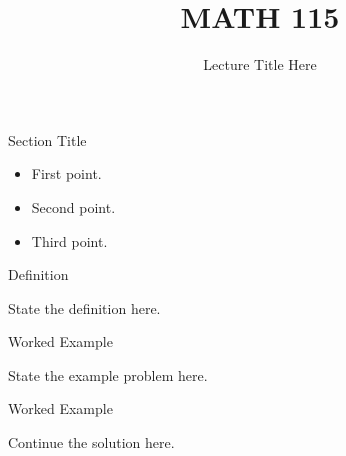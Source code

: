 \documentclass[aspectratio=1610]{beamer}
\title[MATH 115]{MATH 115}
\date{ }
\subtitle{Lecture Title Here}
\begin{document}
\begin{frame}\titlepage\end{frame}


\begin{frame}{Section Title}
\begin{itemize}
    \item First point.
    \item Second point.
    \item Third point.
\end{itemize}
\end{frame}


\begin{frame}{Definition}
    \begin{block}{}
        State the definition here.
    \end{block}
\end{frame}


\begin{frame}[t]{Worked Example}
\begin{exampleN}
    State the example problem here.
\end{exampleN}
\end{frame}

\begin{frame}[t]{Worked Example}
\begin{exampleN*}
    Continue the solution here.
\end{exampleN*}
\end{frame}
\end{document}
